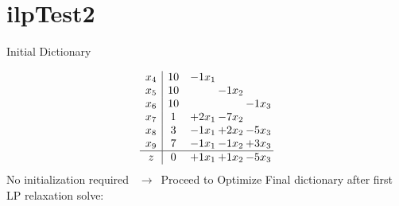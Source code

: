 \documentclass[11pt]{article}
\begin{document}
\section{ilpTest2}

Initial Dictionary 

\[\begin{array}{c| c c@{\hskip 2pt} c@{\hskip 2pt} c@{\hskip 2pt} }
 x_{4}   &  10 & -1 x_{1} &    &   \\
 x_{5}   &  10  &   & -1 x_{2} &   \\
 x_{6}   &  10  &    &   & -1 x_{3}\\
 x_{7}   &  1 & + 2 x_{1} & -7 x_{2} &   \\
 x_{8}   &  3 & -1 x_{1} & + 2 x_{2} & -5 x_{3}\\
 x_{9}   &  7 & -1 x_{1} & -1 x_{2} & + 3 x_{3}\\
\hline
z    &  0 & + 1 x_{1} & + 1 x_{2} & -5 x_{3}\\
\end{array}\]
No initialization required \ $\rightarrow$\  Proceed to Optimize 
Final dictionary after first LP relaxation solve: 
\end{document}
